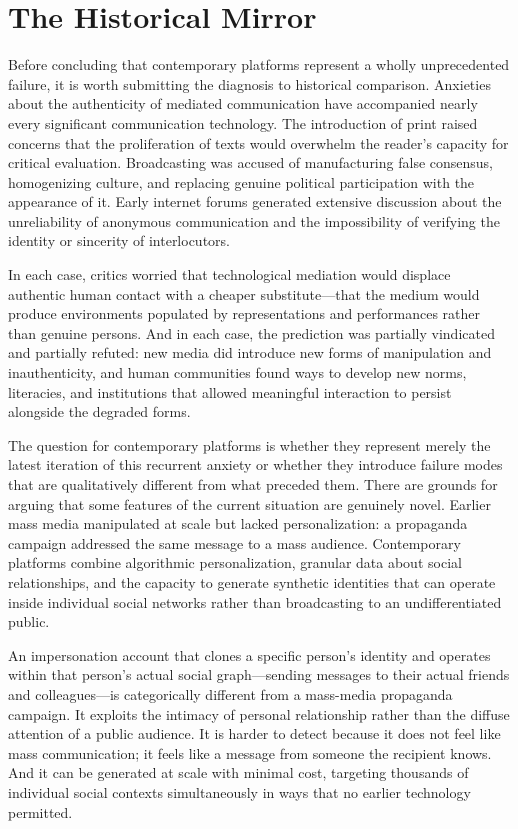 \documentclass[12pt,a4paper]{article}
\begin{document}
\section{The Historical Mirror}

Before concluding that contemporary platforms represent a wholly unprecedented failure, it is
worth submitting the diagnosis to historical comparison. Anxieties about the authenticity of
mediated communication have accompanied nearly every significant communication technology. The
introduction of print raised concerns that the proliferation of texts would overwhelm the reader's
capacity for critical evaluation. Broadcasting was accused of manufacturing false consensus,
homogenizing culture, and replacing genuine political participation with the appearance of it.
Early internet forums generated extensive discussion about the unreliability of anonymous
communication and the impossibility of verifying the identity or sincerity of interlocutors.

In each case, critics worried that technological mediation would displace authentic human contact
with a cheaper substitute---that the medium would produce environments populated by representations
and performances rather than genuine persons. And in each case, the prediction was partially
vindicated and partially refuted: new media did introduce new forms of manipulation and
inauthenticity, and human communities found ways to develop new norms, literacies, and
institutions that allowed meaningful interaction to persist alongside the degraded forms.

The question for contemporary platforms is whether they represent merely the latest iteration of
this recurrent anxiety or whether they introduce failure modes that are qualitatively different
from what preceded them. There are grounds for arguing that some features of the current
situation are genuinely novel. Earlier mass media manipulated at scale but lacked personalization:
a propaganda campaign addressed the same message to a mass audience. Contemporary platforms
combine algorithmic personalization, granular data about social relationships, and the capacity
to generate synthetic identities that can operate inside individual social networks rather than
broadcasting to an undifferentiated public.

An impersonation account that clones a specific person's identity and operates within that
person's actual social graph---sending messages to their actual friends and colleagues---is
categorically different from a mass-media propaganda campaign. It exploits the intimacy of
personal relationship rather than the diffuse attention of a public audience. It is harder to
detect because it does not feel like mass communication; it feels like a message from someone
the recipient knows. And it can be generated at scale with minimal cost, targeting thousands of
individual social contexts simultaneously in ways that no earlier technology permitted.
\end{document}
